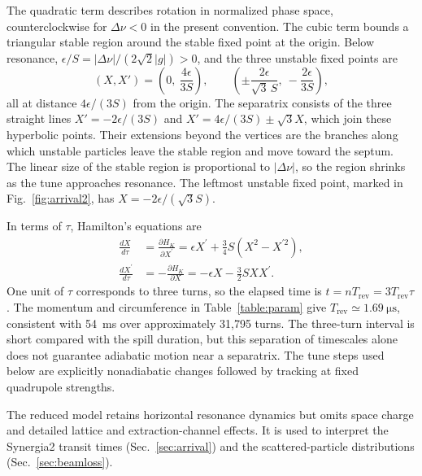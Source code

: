 \documentclass[a4paper,fleqn]{cas-sc}
\begin{document}
The quadratic term describes rotation in normalized phase space, counterclockwise for $\Delta\nu<0$ in the present convention. The cubic term bounds a triangular stable region around the stable fixed point at the origin. Below resonance, $\epsilon/S=|\Delta\nu|/(2\sqrt{2}|g|)>0$, and the three unstable fixed points are
\begin{equation}
 (X,X')=\left(0,\ \frac{4\epsilon}{3S}\right),\qquad
 \left(\pm\frac{2\epsilon}{\sqrt{3}\,S},\ -\frac{2\epsilon}{3S}\right),
 \label{eqn:fixedpoints}
\end{equation}
all at distance $4\epsilon/(3S)$ from the origin. The separatrix consists of the three straight lines $X'=-2\epsilon/(3S)$ and $X'=4\epsilon/(3S)\pm\sqrt{3}X$, which join these hyperbolic points. Their extensions beyond the vertices are the branches along which unstable particles leave the stable region and move toward the septum. The linear size of the stable region is proportional to $|\Delta\nu|$, so the region shrinks as the tune approaches resonance. The leftmost unstable fixed point, marked in Fig.~\ref{fig:arrival2}, has $X=-2\epsilon/(\sqrt{3}S)$.

In terms of $\tau$, Hamilton's equations are
\begin{equation}
 \begin{split}
  \frac{dX}{d\tau} & = \frac{\partial H_{K}}{\partial X^{\prime}}
                  = \epsilon X^{\prime} + \frac{3}{4} S
                    \left(
                      X^{2} - X^{\prime 2}
                    \right), \\
  \frac{dX^{\prime}}{d\tau} & = - \frac{\partial H_{K}}{\partial X}
                           = - \epsilon X - \frac{3}{2} S X X^{\prime}.
 \end{split}
\label{eqn:motion}
\end{equation}
One unit of $\tau$ corresponds to three turns, so the elapsed time is $t=nT_{\mathrm{rev}}=3T_{\mathrm{rev}}\tau$. The momentum and circumference in Table~\ref{table:param} give $T_{\mathrm{rev}}\simeq\SI{1.69}{\micro\second}$, consistent with \SI{54}{\milli\second} over approximately 31,795 turns. The three-turn interval is short compared with the spill duration, but this separation of timescales alone does not guarantee adiabatic motion near a separatrix. The tune steps used below are explicitly nonadiabatic changes followed by tracking at fixed quadrupole strengths.

The reduced model retains horizontal resonance dynamics but omits space charge and detailed lattice and extraction-channel effects. It is used to interpret the Synergia2 transit times (Sec.~\ref{sec:arrival}) and the scattered-particle distributions (Sec.~\ref{sec:beamloss}).
\end{document}
